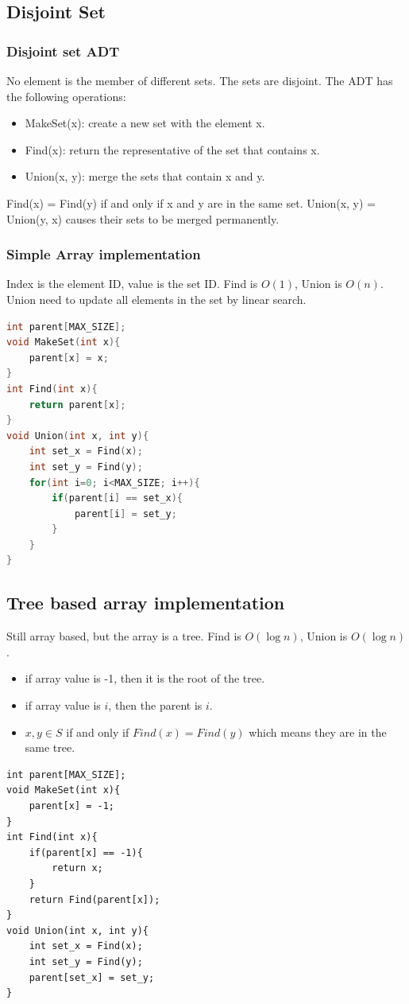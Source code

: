 \documentclass[letterpaper,12pt]{article}
\begin{document}
\subsection{Disjoint Set}
\subsubsection{Disjoint set ADT}
No element is the member of different sets. The sets are disjoint. The ADT has the following operations:\begin{itemize}
    \item MakeSet(x): create a new set with the element x.
    \item Find(x): return the representative of the set that contains x.
    \item Union(x, y): merge the sets that contain x and y.
\end{itemize}
Find(x) = Find(y) if and only if x and y are in the same set. Union(x, y) = Union(y, x) causes their sets to be merged permanently.
\subsubsection{Simple Array implementation}
Index is the element ID, value is the set ID. Find is $O(1)$, Union is $O(n)$. Union need to update all elements in the set by linear search.
\begin{lstlisting}[language=C++]
int parent[MAX_SIZE];
void MakeSet(int x){
    parent[x] = x;
}
int Find(int x){
    return parent[x];
}
void Union(int x, int y){
    int set_x = Find(x);
    int set_y = Find(y);
    for(int i=0; i<MAX_SIZE; i++){
        if(parent[i] == set_x){
            parent[i] = set_y;
        }
    }
}
\end{lstlisting}
\subsection{Tree based array implementation}
Still array based, but the array is a tree. Find is $O(\log n)$, Union is $O(\log n)$.\begin{itemize}
    \item if array value is -1, then it is the root of the tree.
    \item if array value is $i$, then the parent is $i$.
    \item $x,y \in S$ if and only if $Find(x) = Find(y)$ which means they are in the same tree.
\end{itemize}
\begin{lstlisting}
int parent[MAX_SIZE];
void MakeSet(int x){
    parent[x] = -1;
}
int Find(int x){
    if(parent[x] == -1){
        return x;
    }
    return Find(parent[x]);
}
void Union(int x, int y){
    int set_x = Find(x);
    int set_y = Find(y);
    parent[set_x] = set_y;
}
\end{lstlisting}
\end{document}
